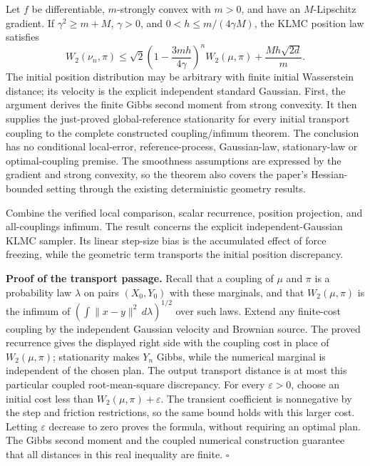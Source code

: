 \documentclass[11pt,a4paper]{article}
\begin{document}
Let \(f\) be differentiable, \(m\)-strongly convex with \(m>0\), and have an \(M\)-Lipschitz gradient. If \(\gamma^2\ge m+M\), \(\gamma>0\), and \(0<h\le m/(4\gamma M)\), the KLMC position law satisfies \[W_2(\nu_n,\pi)\le\sqrt2\left(1-\frac{3mh}{4\gamma}\right)^nW_2(\mu,\pi)+\frac{Mh\sqrt{2d}}m.\] The initial position distribution may be arbitrary with finite initial Wasserstein distance; its velocity is the explicit independent standard Gaussian. First, the argument derives the finite Gibbs second moment from strong convexity. It then supplies the just-proved global-reference stationarity for every initial transport coupling to the complete constructed coupling/\allowbreak{}infimum theorem. The conclusion has no conditional local-error, reference-process, Gaussian-law, stationary-law or optimal-coupling premise. The smoothness assumptions are expressed by the gradient and strong convexity, so the theorem also covers the paper's Hessian-bounded setting through the existing deterministic geometry results.



Combine the verified local comparison, scalar recurrence, position projection, and all-couplings infimum. The result concerns the explicit independent-Gaussian KLMC sampler. Its linear step-size bias is the accumulated effect of force freezing, while the geometric term transports the initial position discrepancy.




\textbf{Proof of the transport passage.} Recall that a coupling of \(\mu\) and \(\pi\) is a probability law \(\lambda\) on pairs \((X_0,Y_0)\) with these marginals, and that \(W_2(\mu,\pi)\) is the infimum of \((\int\|x-y\|^2\,d\lambda)^{1/2}\) over such laws. Extend any finite-cost coupling by the independent Gaussian velocity and Brownian source. The proved recurrence gives the displayed right side with the coupling cost in place of \(W_2(\mu,\pi)\); stationarity makes \(Y_n\) Gibbs, while the numerical marginal is independent of the chosen plan. The output transport distance is at most this particular coupled root-mean-square discrepancy. For every \(\varepsilon>0\), choose an initial cost less than \(W_2(\mu,\pi)+\varepsilon\). The transient coefficient is nonnegative by the step and friction restrictions, so the same bound holds with this larger cost. Letting \(\varepsilon\) decrease to zero proves the formula, without requiring an optimal plan. The Gibbs second moment and the coupled numerical construction guarantee that all distances in this real inequality are finite. \(\square\)
\end{document}
